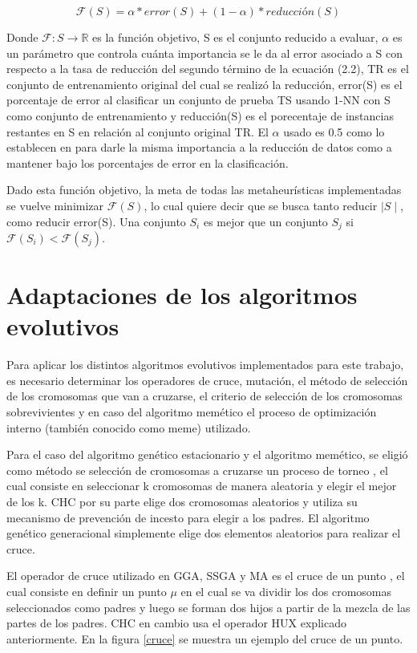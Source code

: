 \begin{equation}
\mathcal{F}(S) = \alpha * error(S) + (1 - \alpha) * reducción(S)
\end{equation} 

Donde $\mathcal{F}: S \rightarrow \mathbb{R}$ es la función objetivo, S es el conjunto reducido a evaluar, $\alpha$ es un parámetro que controla cuánta importancia se le da al error asociado a S con respecto a la tasa de reducción del segundo término de la ecuación (2.2), TR es el conjunto de entrenamiento original del cual se realizó la reducción, error(S) es el porcentaje de error al clasificar un conjunto de prueba TS usando 1-NN con S como conjunto de entrenamiento y reducción(S) es el porecentaje de instancias restantes en S en relación al conjunto original TR. El $\alpha$ usado es 0.5 como lo establecen en \cite{de2004reduccion} para darle la misma importancia a la reducción de datos como a mantener bajo los porcentajes de error en la clasificación.

Dado esta función objetivo, la meta de todas las metaheurísticas implementadas se vuelve minimizar $\mathcal{F}(S)$, lo cual quiere decir que se busca tanto reducir $\mid S \mid$, como reducir error(S). Una conjunto $S_i$ es mejor que un conjunto $S_j$ si $\mathcal{F}(S_i) < \mathcal{F}(S_j)$.  

\section{Adaptaciones de los algoritmos evolutivos}

Para aplicar los distintos algoritmos evolutivos implementados para este trabajo, es necesario determinar los operadores de cruce, mutación, el método de selección de los cromosomas que van a cruzarse, el criterio de selección de los cromosomas sobrevivientes y en caso del algoritmo memético el proceso de optimización interno (también conocido como meme) utilizado.

Para el caso del algoritmo genético estacionario y el algoritmo memético, se eligió como método se selección de cromosomas a cruzarse un proceso de torneo \cite{talbi2009metaheuristics}, el cual consiste en seleccionar k cromosomas de manera aleatoria y elegir el mejor de los k. CHC por su parte elige dos cromosomas aleatorios y utiliza su mecanismo de prevención de incesto para elegir a los padres. El algoritmo genético generacional simplemente elige dos elementos aleatorios para realizar el cruce.

El operador de cruce utilizado en GGA, SSGA y MA es el cruce de un punto \cite{talbi2009metaheuristics}, el cual consiste en definir un punto $\mu$ en el cual se va dividir los dos cromosomas seleccionados como padres y luego se forman dos hijos a partir de la mezcla de las partes de los padres. CHC en cambio usa el operador HUX explicado anteriormente. En la figura \ref{cruce} se muestra un ejemplo del cruce de un punto. 

